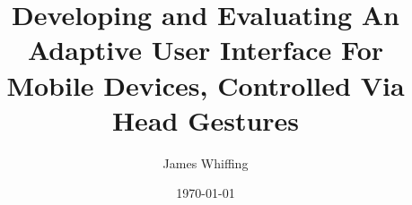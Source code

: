 


%
%

\title{Developing and Evaluating An Adaptive User Interface For Mobile Devices, Controlled Via Head Gestures}
\date{\today}
\author{James Whiffing} %
\renewcommand{\shortauthors}{Whiffing, James}


\begin{CCSXML}

\end{CCSXML}

